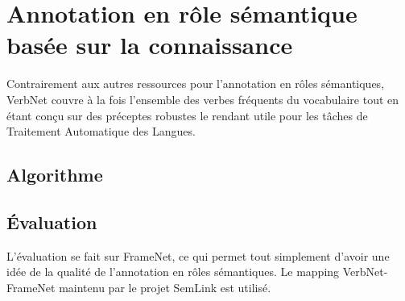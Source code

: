\chapter{Annotation en rôle sémantique basée sur la connaissance}
\label{ch:srl}


Contrairement aux autres ressources pour l'annotation en rôles sémantiques, VerbNet couvre à la fois l'ensemble des verbes fréquents du vocabulaire tout en étant conçu sur des préceptes robustes le rendant utile pour les tâches de Traitement Automatique des Langues.

\section{Algorithme}

\section{Évaluation}

L'évaluation se fait sur FrameNet, ce qui permet tout simplement d'avoir une idée de la qualité de l'annotation en rôles sémantiques. Le mapping VerbNet-FrameNet maintenu par le projet SemLink est utilisé.
